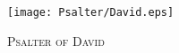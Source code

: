 \fancyhead[RE,LO]{}\fancyhead[RO,LE]{}
\fancyhead[C]{}\thispagestyle{empty}
{}

\begin{figure}[H]
    \centering
    \texttt{[image: Psalter/David.eps]}
    \caption{\textsc{\Huge{Psalter of David}}}
\end{figure}